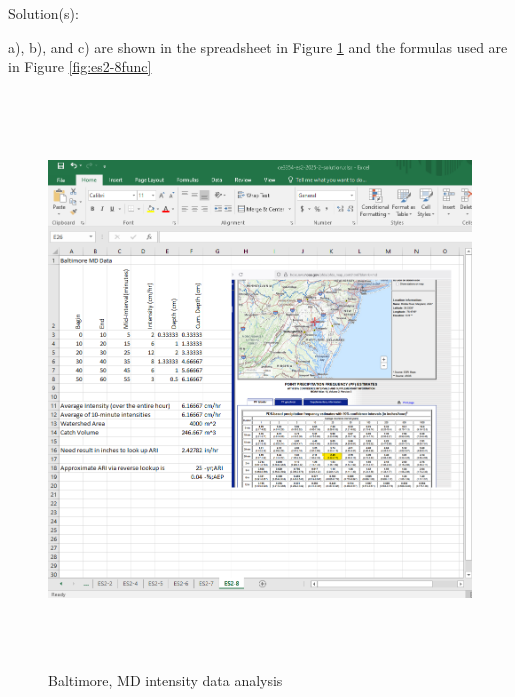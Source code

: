 \documentclass[12pt]{article}
\begin{document}
\begin{enumerate}
Solution(s):

a), b), and c) are shown in the spreadsheet in Figure \ref{fig:es2-8xls} and the formulas used are in Figure \ref{fig:es2-8func}

\begin{figure}[h!] %
   \centering
   \includegraphics[height=6in]{es2-8xls.png} 
   \caption{Baltimore, MD intensity data analysis}
   \label{fig:es2-8xls}
\end{figure}


\end{enumerate}
\end{document}
